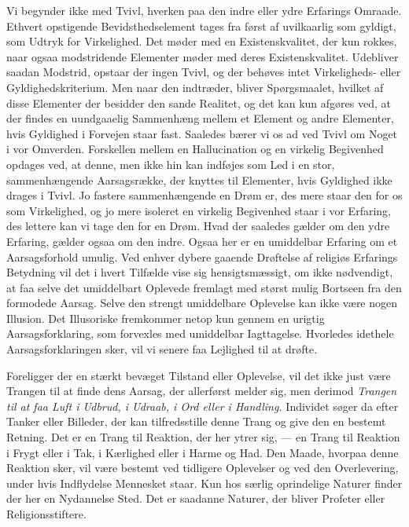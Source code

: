 \documentclass[12pt,a4paper,openany]{book}
\newcommand{\opage}[1]{\marginnote{\footnotesize\textit{[#1]}}}
\begin{document}
Vi begynder ikke med Tvivl, hverken paa den indre eller ydre Erfarings
Omraade. Ethvert opstigende Bevidsthedselement tages fra først af
uvilkaarlig som gyldigt, som Udtryk for Virkelighed. Det møder med en
Existenskvalitet, der kun rokkes, naar ogsaa modstridende Elementer
møder med deres Existenskvalitet. Udebliver saadan Modstrid, opstaar der
ingen Tvivl, og der behøves intet Virkeligheds- eller
Gyldighedskriterium. Men naar den indtræder, bliver Spørgsmaalet,
hvilket af disse Elementer der besidder den sande Realitet, og det kan
kun afgøres ved, at der findes en uundgaaelig Sammenhæng mellem et
Element og andre Elementer, hvis Gyldighed i Forvejen staar fast.
Saaledes bærer vi os ad ved Tvivl om Noget i vor Omverden. Forskellen
mellem en Hallucination og en virkelig Begivenhed opdages ved, at denne,
men ikke hin kan indføjes som Led i en stor, sammenhængende
Aarsagsrække, der knyttes til Elementer, hvis Gyldighed ikke
\opage{58}drages i Tvivl. Jo fastere sammenhængende en Drøm er, des mere
staar den for os som Virkelighed, og jo mere isoleret en virkelig
Begivenhed staar i vor Erfaring, des lettere kan vi tage den for en
Drøm. Hvad der saaledes gælder om den ydre Erfaring, gælder ogsaa om den
indre. Ogsaa her er en umiddelbar Erfaring om et Aarsagsforhold umulig.
Ved enhver dybere gaaende Drøftelse af religiøs Erfarings Betydning vil
det i hvert Tilfælde vise sig hensigtsmæssigt, om ikke nødvendigt, at
faa selve det umiddelbart Oplevede fremlagt med størst mulig Bortseen
fra den formodede Aarsag. Selve den strengt umiddelbare Oplevelse kan
ikke være nogen Illusion. Det Illusoriske fremkommer netop kun gennem en
urigtig Aarsagsforklaring, som forvexles med umiddelbar Iagttagelse.
Hvorledes idethele Aarsagsforklaringen sker, vil vi senere faa Lejlighed
til at drøfte.

Foreligger der en stærkt bevæget Tilstand eller Oplevelse, vil det ikke
just være Trangen til at finde dens Aarsag, der allerførst melder sig,
men derimod \textit{Trangen til at faa Luft i Udbrud, i Udraab, i Ord
eller i Handling.} Individet søger da efter Tanker eller Billeder, der
kan tilfredsstille denne Trang og give den en bestemt Retning. Det er en
Trang til Reaktion, der her ytrer sig, --- en Trang til Reaktion i Frygt
eller i Tak, i Kærlighed eller i Harme og Had. Den Maade, hvorpaa denne
Reaktion sker, vil være bestemt ved tidligere Oplevelser og ved den
Overlevering, under hvis Indflydelse Mennesket staar. Kun hos særlig
oprindelige Naturer finder der her en Nydannelse Sted. Det er saadanne
Naturer, der bliver Profeter eller Religionsstiftere.
\end{document}
